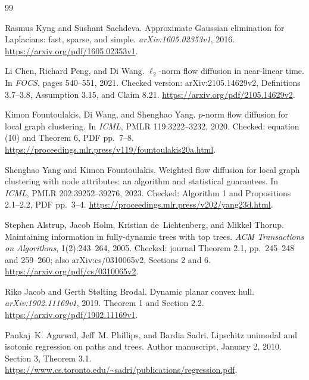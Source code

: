 \begin{thebibliography}{99}

Rasmus Kyng and Sushant Sachdeva.
\newblock Approximate Gaussian elimination for Laplacians: fast, sparse, and simple.
\newblock \emph{arXiv:1605.02353v1}, 2016.
\newblock \url{https://arxiv.org/pdf/1605.02353v1}.

Li Chen, Richard Peng, and Di Wang.
\newblock $\ell_2$-norm flow diffusion in near-linear time.
\newblock In \emph{FOCS}, pages 540--551, 2021.
\newblock Checked version: arXiv:2105.14629v2, Definitions 3.7--3.8,
Assumption 3.15, and Claim 8.21.
\newblock \url{https://arxiv.org/pdf/2105.14629v2}.

Kimon Fountoulakis, Di Wang, and Shenghao Yang.
\newblock $p$-norm flow diffusion for local graph clustering.
\newblock In \emph{ICML}, PMLR 119:3222--3232, 2020.
\newblock Checked: equation (10) and Theorem 6, PDF pp.\ 7--8.
\newblock \url{https://proceedings.mlr.press/v119/fountoulakis20a.html}.

Shenghao Yang and Kimon Fountoulakis.
\newblock Weighted flow diffusion for local graph clustering with node
attributes: an algorithm and statistical guarantees.
\newblock In \emph{ICML}, PMLR 202:39252--39276, 2023.
\newblock Checked: Algorithm 1 and Propositions 2.1--2.2, PDF pp.\ 3--4.
\newblock \url{https://proceedings.mlr.press/v202/yang23d.html}.

Stephen Alstrup, Jacob Holm, Kristian de~Lichtenberg, and Mikkel Thorup.
\newblock Maintaining information in fully-dynamic trees with top trees.
\newblock \emph{ACM Transactions on Algorithms}, 1(2):243--264, 2005.
\newblock Checked: journal Theorem 2.1, pp.\ 245--248 and 259--260;
also arXiv:cs/0310065v2, Sections 2 and 6.
\newblock \url{https://arxiv.org/pdf/cs/0310065v2}.

Riko Jacob and Gerth St\o lting Brodal.
\newblock Dynamic planar convex hull.
\newblock \emph{arXiv:1902.11169v1}, 2019. Theorem 1 and Section 2.2.
\newblock \url{https://arxiv.org/pdf/1902.11169v1}.

Pankaj~K. Agarwal, Jeff~M. Phillips, and Bardia Sadri.
\newblock Lipschitz unimodal and isotonic regression on paths and trees.
\newblock Author manuscript, January 2, 2010. Section 3, Theorem 3.1.
\newblock \url{https://www.cs.toronto.edu/~sadri/publications/regression.pdf}.


\end{thebibliography}
